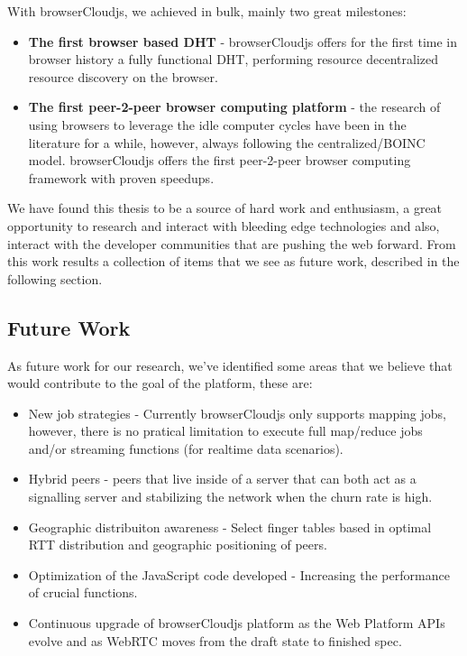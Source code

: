 With browserCloudjs, we achieved in bulk, mainly two great milestones:

\begin{itemize}
    \item \textbf{The first browser based DHT} - browserCloudjs offers for the first time in browser history a fully functional DHT, performing resource decentralized resource discovery on the browser. 
    \item \textbf{The first peer-2-peer browser computing platform} - the research of using browsers to leverage the idle computer cycles have been in the literature for a while, however, always following the centralized/BOINC model. browserCloudjs offers the first peer-2-peer browser computing framework with proven speedups.
\end{itemize}

We have found this thesis to be a source of hard work and enthusiasm, a great opportunity to research and interact with bleeding edge technologies and also, interact with the developer communities that are pushing the web forward. From this work results a collection of items that we see as future work, described in the following section.

\subsection{Future Work}

As future work for our research, we've identified some areas that we believe that would contribute to the goal of the platform, these are:

\begin{itemize}
    \item New job strategies - Currently browserCloudjs only supports mapping jobs, however, there is no pratical limitation to execute full map/reduce jobs and/or streaming functions (for realtime data scenarios).
    \item Hybrid peers - peers that live inside of a server that can both act as a signalling server and stabilizing the network when the churn rate is high.
    \item Geographic distribuiton awareness - Select finger tables based in optimal RTT distribution and geographic positioning of peers.
    \item Optimization of the JavaScript code developed - Increasing the performance of crucial functions.
    \item Continuous upgrade of browserCloudjs platform as the Web Platform APIs evolve and as WebRTC moves from the draft state to finished spec.
\end{itemize}
